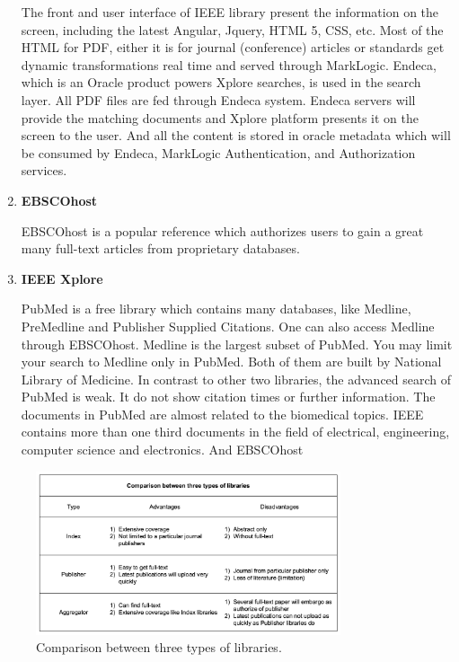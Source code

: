 \begin{enumerate}
	
	The front and user interface of IEEE library present the information on the screen, including the latest Angular, Jquery, HTML 5, CSS, etc. 
	Most of the HTML for PDF, either it is for journal (conference) articles or standards get dynamic transformations real time and served through MarkLogic.
	Endeca, which is an Oracle product powers Xplore searches, is used in the search layer.
	All PDF files are fed through Endeca system.
	Endeca servers will provide the matching documents and Xplore platform presents it on the screen to the user.
	And all the content is stored in oracle metadata which will be consumed by Endeca, MarkLogic Authentication, and Authorization services.
	
	\item\textbf{EBSCOhost}
	\setlength{\parindent}{1em}
	
	EBSCOhost is a popular reference which authorizes users to gain a great many full-text articles from proprietary databases.
	
	\item\textbf{IEEE Xplore}
	\setlength{\parindent}{1em}
	
	PubMed is a free library which contains many databases, like Medline, PreMedline and Publisher Supplied Citations.
    One can also access Medline through EBSCOhost. 
    Medline is the largest subset of PubMed. 
    You may limit your search to Medline only in PubMed. 
    Both of them are built by National Library of Medicine. 
    In contrast to other two libraries, the advanced search of PubMed is weak. 
    It do not show citation times or further information.
    The documents in PubMed are almost related to the biomedical topics.
    IEEE contains more than one third documents in the field of electrical, engineering, computer science and electronics.
    And EBSCOhost 

\end{enumerate}


\begin{figure}[htb]
	\begin{center}
		\includegraphics[width=0.8\textwidth]{Wolverine_Background_Chart_1}
	\end{center}
	\caption{Comparison between three types of libraries.\label{WBC1}}
\end{figure}
\newpage
